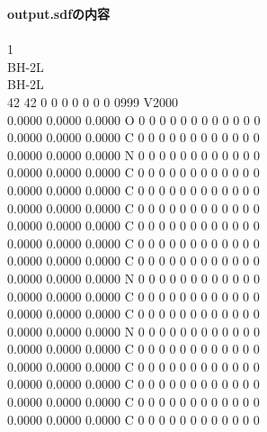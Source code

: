 \documentclass[11pt,titlepage,dvipdfmx,twoside]{jarticle}
\begin{document}
\begin{oframed}
{\bf output.sdfの内容}\\\\
{1																		\\
BH-2L                                                                   \\
BH-2L                                                                   \\
 42 42  0  0  0  0  0  0  0  0999 V2000                                 \\
    0.0000    0.0000    0.0000  O  0  0  0  0  0  0  0  0  0  0  0  0   \\
    0.0000    0.0000    0.0000  C  0  0  0  0  0  0  0  0  0  0  0  0   \\
    0.0000    0.0000    0.0000  N  0  0  0  0  0  0  0  0  0  0  0  0   \\
    0.0000    0.0000    0.0000  C  0  0  0  0  0  0  0  0  0  0  0  0   \\
    0.0000    0.0000    0.0000  C  0  0  0  0  0  0  0  0  0  0  0  0   \\
    0.0000    0.0000    0.0000  C  0  0  0  0  0  0  0  0  0  0  0  0   \\
    0.0000    0.0000    0.0000  C  0  0  0  0  0  0  0  0  0  0  0  0   \\
    0.0000    0.0000    0.0000  C  0  0  0  0  0  0  0  0  0  0  0  0   \\
    0.0000    0.0000    0.0000  C  0  0  0  0  0  0  0  0  0  0  0  0   \\
    0.0000    0.0000    0.0000  N  0  0  0  0  0  0  0  0  0  0  0  0   \\
    0.0000    0.0000    0.0000  C  0  0  0  0  0  0  0  0  0  0  0  0   \\
    0.0000    0.0000    0.0000  C  0  0  0  0  0  0  0  0  0  0  0  0   \\
    0.0000    0.0000    0.0000  N  0  0  0  0  0  0  0  0  0  0  0  0   \\
    0.0000    0.0000    0.0000  C  0  0  0  0  0  0  0  0  0  0  0  0   \\
    0.0000    0.0000    0.0000  C  0  0  0  0  0  0  0  0  0  0  0  0   \\
    0.0000    0.0000    0.0000  C  0  0  0  0  0  0  0  0  0  0  0  0   \\
    0.0000    0.0000    0.0000  C  0  0  0  0  0  0  0  0  0  0  0  0   \\
    0.0000    0.0000    0.0000  C  0  0  0  0  0  0  0  0  0  0  0  0   \\
}
\end{oframed}
\end{document}
